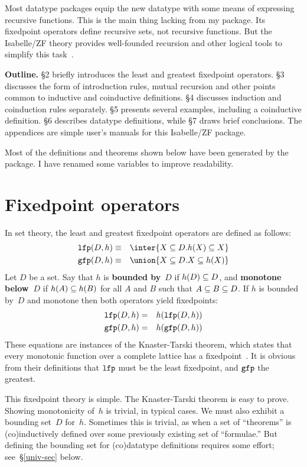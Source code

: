 Most datatype packages equip the new datatype with some means of expressing
recursive functions.  This is the main thing lacking from my package.  Its
fixedpoint operators define recursive sets, not recursive functions.  But
the Isabelle/ZF theory provides well-founded recursion and other logical
tools to simplify this task~\cite{paulson-set-II}.

{\bf Outline.}  \S2 briefly introduces the least and greatest fixedpoint
operators.  \S3 discusses the form of introduction rules, mutual recursion and
other points common to inductive and coinductive definitions.  \S4 discusses
induction and coinduction rules separately.  \S5 presents several examples,
including a coinductive definition.  \S6 describes datatype definitions, while
\S7 draws brief conclusions.  \ifCADE\else The appendices are simple user's
manuals for this Isabelle/ZF package.\fi

Most of the definitions and theorems shown below have been generated by the
package.  I have renamed some variables to improve readability.
 
\section{Fixedpoint operators}
In set theory, the least and greatest fixedpoint operators are defined as
follows:
\begin{eqnarray*}
   \lfp(D,h)  & \equiv & \inter\{X\sbs D. h(X)\sbs X\} \\
   \gfp(D,h)  & \equiv & \union\{X\sbs D. X\sbs h(X)\}
\end{eqnarray*}   
Let $D$ be a set.  Say that $h$ is {\bf bounded by}~$D$ if $h(D)\subseteq D$, and
{\bf monotone below~$D$} if
$h(A)\subseteq h(B)$ for all $A$ and $B$ such that $A\subseteq B\subseteq D$.  If $h$ is
bounded by~$D$ and monotone then both operators yield fixedpoints:
\begin{eqnarray*}
   {\tt lfp}(D,h)  & = & h({\tt lfp}(D,h)) \\
   {\tt gfp}(D,h)  & = & h({\tt gfp}(D,h)) 
\end{eqnarray*}   
These equations are instances of the Knaster-Tarski theorem, which states
that every monotonic function over a complete lattice has a
fixedpoint~\cite{davey&priestley}.  It is obvious from their definitions
that  ${\tt lfp}$ must be the least fixedpoint, and ${\tt gfp}$ the greatest.

This fixedpoint theory is simple.  The Knaster-Tarski theorem is easy to
prove.  Showing monotonicity of~$h$ is trivial, in typical cases.  We must
also exhibit a bounding set~$D$ for~$h$.  Sometimes this is trivial, as
when a set of ``theorems'' is (co)inductively defined over some previously
existing set of ``formulae.''  But defining the bounding set for
(co)datatype definitions requires some effort; see~\S\ref{univ-sec} below.


